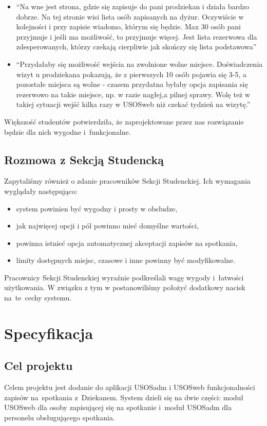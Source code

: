 \documentclass[licencjacka]{pracamgr}
\begin{document}
\begin{itemize}
\begin{itemize}
\item \enquote{Na wne jest strona, gdzie się zapisuje do pani prodziekan i działa bardzo dobrze. Na tej stronie wisi lista osób zapisanych na dyżur. Oczywiście w kolejności i przy zapisie wiadomo, którym się będzie. Max 30 osób pani przyjmuje i jeśli ma możliwość, to przyjmuje więcej. Jest lista rezerwowa dla zdesperowanych, którzy czekają cierpliwie jak skończy się lista podstawowa}
\item \enquote{Przydałaby się możliwość wejścia na zwolnione wolne miejsce. Doświadczenia wizyt u prodziekana pokazują, że z pierwszych 10 osób pojawia się 3-5, a pozostałe miejsca są wolne - czasem przydatna byłaby opcja zapisania się rezerwowo na takie miejsce, np. w razie nagłej,a pilnej sprawy.  Wolę też w takiej sytuacji wejść kilka razy w USOSweb niż czekać tydzień na wizytę.}
\end{itemize}

\end{itemize}
Większość studentów potwierdziła, że zaprojektowane przez nas rozwiązanie będzie dla nich wygodne i~funkcjonalne.
 
\section{Rozmowa z Sekcją Studencką}
Zapytaliśmy również o zdanie pracowników Sekcji Studenckiej. Ich wymagania wyglądały następująco:
\begin{itemize}
\setlength\itemsep{0,05em}
    \item system powinien być wygodny i prosty w obsłudze,
    \item jak najwięcej opcji i pól powinno mieć domyślne wartości,
    \item powinna istnieć opcja automatycznej akceptacji zapisów na spotkania,
    \item limity dostępnych miejsc, czasowe i inne powinny być modyfikowalne.
\end{itemize}
Pracownicy Sekcji Studenckiej wyraźnie podkreślali wagę wygody i~łatwości użytkowania. W związku z tym w postanowiliśmy położyć dodatkowy nacisk na~te~cechy systemu.


\chapter{Specyfikacja} \label{chap:specyfikacja}

\section{Cel projektu}
Celem projektu jest dodanie do aplikacji USOSadm i USOSweb funkcjonalności zapisów na~spotkania z~Dziekanem. System dzieli się na dwie części: moduł USOSweb dla osoby zapisującej się na spotkanie i~moduł USOSadm dla personelu obsługującego spotkania.
\end{document}
